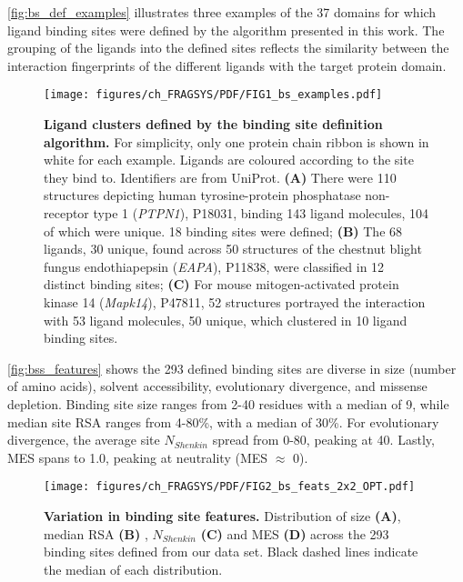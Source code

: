 \autoref{fig:bs_def_examples} illustrates three examples of the 37 domains for which ligand binding sites were defined by the algorithm presented in this work. The grouping of the ligands into the defined sites reflects the similarity between the interaction fingerprints of the different ligands with the target protein domain.

\begin{figure}[ht!]
    \centering
    \texttt{[image: figures/ch\_FRAGSYS/PDF/FIG1\_bs\_examples.pdf]}
    \caption[Ligand clusters defined by the binding site definition algorithm]{\textbf{Ligand clusters defined by the binding site definition algorithm.} For simplicity, only one protein chain ribbon is shown in white for each example. Ligands are coloured according to the site they bind to. Identifiers are from UniProt. \textbf{(A)} There were 110 structures depicting human tyrosine-protein phosphatase non-receptor type 1 (\textit{PTPN1}), P18031, binding 143 ligand molecules, 104 of which were unique. 18 binding sites were defined; \textbf{(B)} The 68 ligands, 30 unique, found across 50 structures of the chestnut blight fungus endothiapepsin (\textit{EAPA}), P11838, were classified in 12 distinct binding sites; \textbf{(C)} For mouse mitogen-activated protein kinase 14 (\textit{Mapk14}), P47811, 52 structures portrayed the interaction with 53 ligand molecules, 50 unique, which clustered in 10 ligand binding sites.}
    \label{fig:bs_def_examples}
\end{figure}

\autoref{fig:bss_features} shows the 293 defined binding sites are diverse in size (number of amino acids), solvent accessibility, evolutionary divergence, and missense depletion. Binding site size ranges from 2-40 residues with a median of 9, while median site RSA ranges from 4-80\%, with a median of 30\%. For evolutionary divergence, the average site $N_{Shenkin}$ spread from 0-80, peaking at 40. Lastly, MES spans  to 1.0, peaking at neutrality (MES $\approx$ 0).

\begin{figure}[ht!]
    \centering
    \texttt{[image: figures/ch\_FRAGSYS/PDF/FIG2\_bs\_feats\_2x2\_OPT.pdf]}
    \caption[Variation in binding site features]{\textbf{Variation in binding site features.} Distribution of size \textbf{(A)}, median RSA \textbf{(B)} , $N_{Shenkin}$ \textbf{(C)} and MES \textbf{(D)} across the 293 binding sites defined from our data set. Black dashed lines indicate the median of each distribution.}
    \label{fig:bss_features}
\end{figure}


